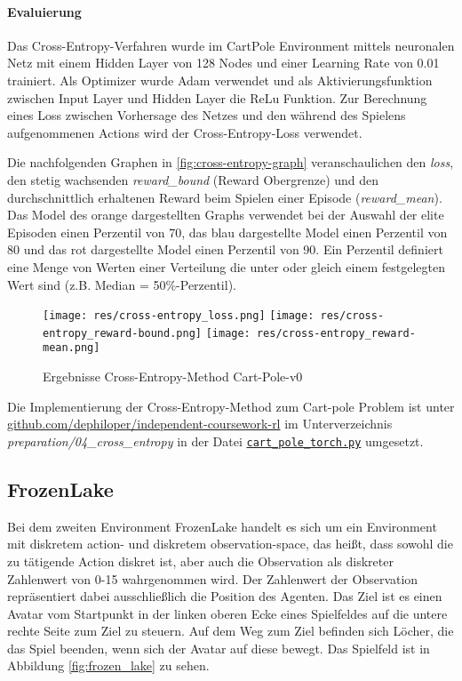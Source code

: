 \documentclass[11pt]{scrartcl}
\begin{document}
\paragraph*{Evaluierung}
\noindent
\newline
Das Cross-Entropy-Verfahren wurde im CartPole Environment mittels neuronalen Netz mit
einem Hidden Layer von 128 Nodes und einer Learning Rate von 0.01 trainiert. Als
Optimizer wurde Adam verwendet und als Aktivierungsfunktion zwischen Input Layer und
Hidden Layer die ReLu Funktion. Zur Berechnung eines Loss zwischen Vorhersage des Netzes
und den während des Spielens aufgenommenen Actions wird der Cross-Entropy-Loss verwendet.

Die nachfolgenden Graphen in \autoref{fig:cross-entropy-graph} veranschaulichen den
\textit{loss}, den stetig wachsenden \textit{reward\_bound} (Reward Obergrenze) und den
durchschnittlich erhaltenen Reward beim Spielen einer Episode (\textit{reward\_mean}).
Das Model des orange dargestellten Graphs verwendet bei der Auswahl der elite Episoden
einen Perzentil von 70, das blau dargestellte Model einen Perzentil von 80 und das
rot dargestellte Model einen Perzentil von 90. Ein Perzentil definiert eine Menge von
Werten einer Verteilung die unter oder gleich einem festgelegten Wert sind (z.B. Median 
= 50\%-Perzentil). 

\begin{figure}[htp]
\centering
\texttt{[image: res/cross-entropy\_loss.png]}
\texttt{[image: res/cross-entropy\_reward-bound.png]}
\texttt{[image: res/cross-entropy\_reward-mean.png]}
\caption{Ergebnisse Cross-Entropy-Method Cart-Pole-v0}
\label{fig:cross-entropy-graph}
\end{figure}

Die Implementierung der Cross-Entropy-Method zum Cart-pole Problem ist unter
\url{github.com/dephiloper/independent-coursework-rl} im Unterverzeichnis 
\textit{preparation/04\_cross\_entropy} in der Datei
\href{https://github.com/dephiloper/independent-coursework-rl/blob/master/preparation/04_cross_entropy/cart_pole_torch.py}{\nolinkurl{cart\_pole\_torch.py}} umgesetzt.


\subsection{FrozenLake}
\label{sec:frozen-lake}
Bei dem zweiten Environment FrozenLake handelt es sich um ein Environment mit diskretem action-
und diskretem observation-space, das heißt, dass sowohl die zu tätigende Action diskret ist,
aber auch die Observation als diskreter Zahlenwert von 0-15 wahrgenommen wird. Der Zahlenwert
der Observation repräsentiert dabei ausschließlich die Position des Agenten. Das Ziel ist es
einen Avatar vom Startpunkt in der linken oberen Ecke eines Spielfeldes auf die untere rechte
Seite zum Ziel zu steuern. Auf dem Weg zum Ziel befinden sich Löcher, die das Spiel beenden, wenn
sich der Avatar auf diese bewegt. Das Spielfeld ist in Abbildung \ref{fig:frozen_lake} zu sehen.
\end{document}
